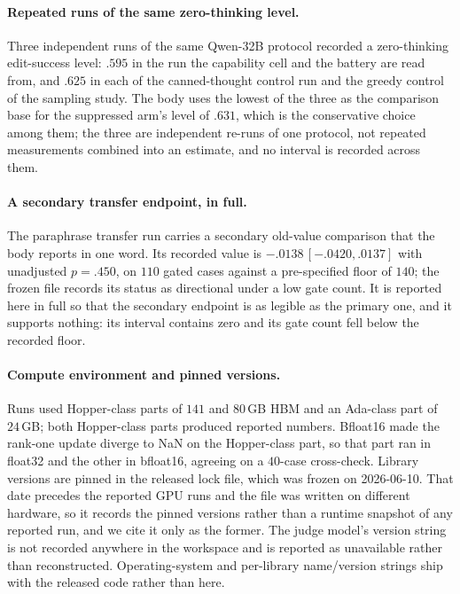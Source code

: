 \documentclass[letterpaper]{article}
\begin{document}
\paragraph{Repeated runs of the same zero-thinking level.}
Three independent runs of the same Qwen-32B protocol recorded a zero-thinking
edit-success level: \(.595\) in the run the capability cell and the battery are
read from, and \(.625\) in each of the canned-thought control run and the greedy
control of the sampling study.  The body uses the lowest of the three as the
comparison base for the suppressed arm's level of \(.631\), which is the
conservative choice among them; the three are independent re-runs of one
protocol, not repeated measurements combined into an estimate, and no interval
is recorded across them.

\paragraph{A secondary transfer endpoint, in full.}
The paraphrase transfer run carries a secondary old-value comparison that the
body reports in one word.  Its recorded value is
\(-.0138\,[-.0420, .0137]\) with unadjusted \(p=.450\), on \(110\) gated cases
against a pre-specified floor of \(140\); the frozen file records its status as
directional under a low gate count.  It is reported here in full so that the
secondary endpoint is as legible as the primary one, and it supports nothing:
its interval contains zero and its gate count fell below the recorded floor.

\paragraph{Compute environment and pinned versions.}
Runs used Hopper-class parts of \(141\) and \(80\)\,GB HBM and an Ada-class part
of \(24\)\,GB; both Hopper-class parts produced reported numbers.  Bfloat16 made
the rank-one update diverge to NaN on the Hopper-class part, so that part ran in
float32 and the other in bfloat16, agreeing on a \(40\)-case cross-check.
Library versions are pinned in the released lock file, which was frozen on
2026-06-10.  That date precedes the reported GPU runs and the file was written
on different hardware, so it records the pinned versions rather than a runtime
snapshot of any reported run, and we cite it only as the former.  The judge
model's version string is not recorded anywhere in the workspace and is reported
as unavailable rather than reconstructed.  Operating-system and per-library
name/version strings ship with the released code rather than here.
\end{document}

